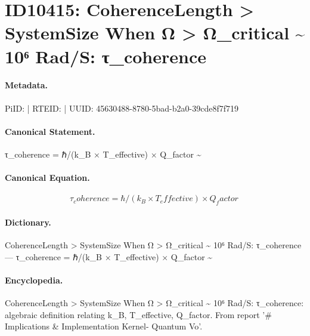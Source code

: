 \section*{ID10415: CoherenceLength > SystemSize When Ω > Ω\_critical \textasciitilde{} 10⁶ Rad/S: τ\_coherence}
\paragraph{Metadata.}
PiID:  | RTEID:  | UUID: 45630488-8780-5bad-b2a0-39cde8f7f719

\paragraph{Canonical Statement.}
τ\_coherence = ℏ/(k\_B × T\_effective) × Q\_factor \textasciitilde{}

\paragraph{Canonical Equation.}
\[
τ_coherence = ℏ/(k_B × T_effective) × Q_factor ~
\]

\paragraph{Dictionary.}
CoherenceLength > SystemSize When Ω > Ω\_critical \textasciitilde{} 10⁶ Rad/S: τ\_coherence — τ\_coherence = ℏ/(k\_B × T\_effective) × Q\_factor \textasciitilde{}

\paragraph{Encyclopedia.}
CoherenceLength > SystemSize When Ω > Ω\_critical \textasciitilde{} 10⁶ Rad/S: τ\_coherence: algebraic definition relating k\_B, T\_effective, Q\_factor. From report '\# Implications \& Implementation Kernel- Quantum Vo'.
